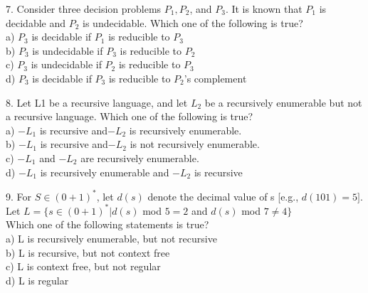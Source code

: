 \documentclass[11pt]{article}
\begin{document}
\hspace*{-0.4cm}
7. Consider three decision problems $P _{1},P _{2}$, and $P _{3}$. It is known that $P _{1}$ is decidable and $P _{2}$ is undecidable.
Which one of the following is true?\\
\hspace*{0.5cm} a) $P _{3}$ is decidable if $P _{1}$ is reducible to $P _{3}$ \\
\hspace*{0.5cm} b) $P _{3}$ is undecidable if $P _{3}$ is reducible to $P _{2}$ \\
\hspace*{0.5cm} c) $P _{3}$ is undecidable if $P _{2}$ is reducible to $P _{3}$ \\
\hspace*{0.5cm} d) $P _{3}$ is decidable if $P _{3}$ is reducible to $P _{2}$’s complement\\
\vspace*{0.2cm}


\hspace*{-0.4cm}
8. Let L1 be a recursive language, and let $L _{2}$ be a recursively enumerable but not a recursive language.
Which one of the following is true?\\

\vspace*{0.1cm}
\hspace*{0.5cm} a) $-L _{1}$ is recursive and$-L _{2}$ is recursively enumerable.\\
\hspace*{0.5cm} b) $-L _{1}$ is recursive and$-L _{2}$ is not recursively enumerable.\\
\hspace*{0.5cm} c) $-L _{1}$ and $-L _{2}$ are recursively enumerable.\\
\hspace*{0.5cm} d) $-L _{1}$ is recursively enumerable and $-L _{2}$ is recursive\\
\vspace*{0.2cm}

\hspace*{-0.4cm}
9. For $S \in (0 + 1)^{*}$, let $d(s)$ denote the decimal value of s [e.g., $d(101) = 5]$. Let $L = \{s \in (0 + 1)^{*} |
d(s)$ mod $5 = 2$ and $d(s)$ mod $7 \neq 4\}$\\

\vspace*{0.1cm}
\hspace*{0.5cm} Which one of the following statements is true?\\
\hspace*{0.5cm} a) L is recursively enumerable, but not recursive\\
\hspace*{0.5cm} b) L is recursive, but not context free\\
\hspace*{0.5cm} c) L is context free, but not regular\\
\hspace*{0.5cm} d) L is regular\\
\end{document}

